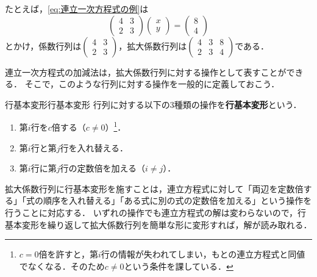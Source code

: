 たとえば，\eqref{eq:連立一次方程式の例}は
\[
  \begin{pmatrix} 4 & 3 \\ 2 & 3 \end{pmatrix}
  \begin{pmatrix} x \\ y \end{pmatrix}
  =
  \begin{pmatrix} 8 \\ 4 \end{pmatrix}
\]
とかけ，係数行列は$\begin{pmatrix} 4 & 3 \\ 2 & 3 \end{pmatrix}$，拡大係数行列は$\begin{pmatrix} 4 & 3 & 8 \\ 2 & 3 & 4 \end{pmatrix}$である．

連立一次方程式の加減法は，拡大係数行列に対する操作として表すことができる．
そこで，このような行列に対する操作を一般的に定義しておこう．

\begin{definition}{行基本変形}{行基本変形}
  行列に対する以下の$3$種類の操作を\textbf{行基本変形}という．
  \begin{enumerate}[label=(\arabic*),leftmargin=3.2em]
    \item 第$i$行を$c$倍する（$c \ne 0$）\footnote{$c = 0$倍を許すと，第$i$行の情報が失われてしまい，もとの連立方程式と同値でなくなる．そのため$c \ne 0$という条件を課している．}．
    \item 第$i$行と第$j$行を入れ替える．
    \item 第$i$行に第$j$行の定数倍を加える（$i \ne j$）．
  \end{enumerate}
\end{definition}

拡大係数行列に行基本変形を施すことは，連立方程式に対して「両辺を定数倍する」「式の順序を入れ替える」「ある式に別の式の定数倍を加える」という操作を行うことに対応する．
いずれの操作でも連立方程式の解は変わらないので，行基本変形を繰り返して拡大係数行列を簡単な形に変形すれば，解が読み取れる．

